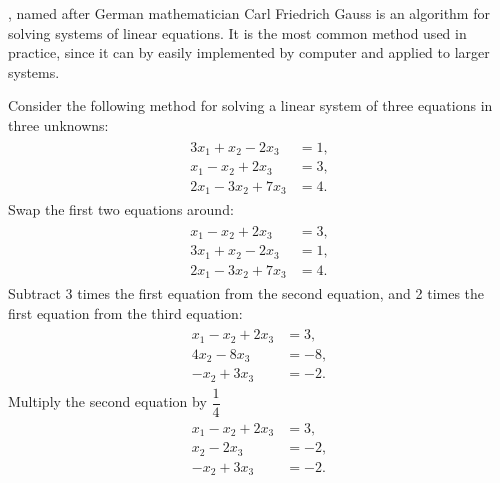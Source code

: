 \documentclass[letterpaper,10pt,english]{jupyterBook}
\begin{document}
\sphinxAtStartPar
{}, named after German mathematician Carl Friedrich Gauss is an algorithm for solving systems of linear equations. It is the most common method used in practice, since it can by easily implemented by computer and applied to larger systems.

\sphinxAtStartPar
Consider the following method for solving a linear system of three equations in three unknowns:
\begin{equation*}
\begin{split} \begin{align*}
    3x_1 + x_2 - 2x_3 &= 1, \\
    x_1 - x_2 + 2x_3 &= 3, \\
    2x_1 - 3x_2 + 7x_3 &= 4.
\end{align*} \end{split}
\end{equation*}
\sphinxAtStartPar
Swap the first two equations around:
\begin{equation*}
\begin{split} \begin{align*}
    x_1 - x_2 + 2x_3 &= 3, \\
    3x_1 + x_2 - 2x_3 &= 1, \\
    2x_1 - 3x_2 + 7x_3 &= 4.
\end{align*} \end{split}
\end{equation*}
\sphinxAtStartPar
Subtract 3 times the first equation from the second equation, and 2 times the first equation from the third equation:
\begin{equation*}
\begin{split} \begin{align*}
    x_1 - x_2 + 2x_3 &= 3, \\
    4x_2 - 8x_3 &= -8, \\
    - x_2 + 3x_3 &= -2.
\end{align*} \end{split}
\end{equation*}
\sphinxAtStartPar
Multiply the second equation by \(\dfrac{1}{4}\)
\begin{equation*}
\begin{split} \begin{align*}
    x_1 - x_2 + 2x_3 &= 3, \\
    x_2 - 2 x_3 &= -2, \\
    - x_2 + 3x_3 &= -2.
\end{align*} \end{split}
\end{equation*}
\end{document}
